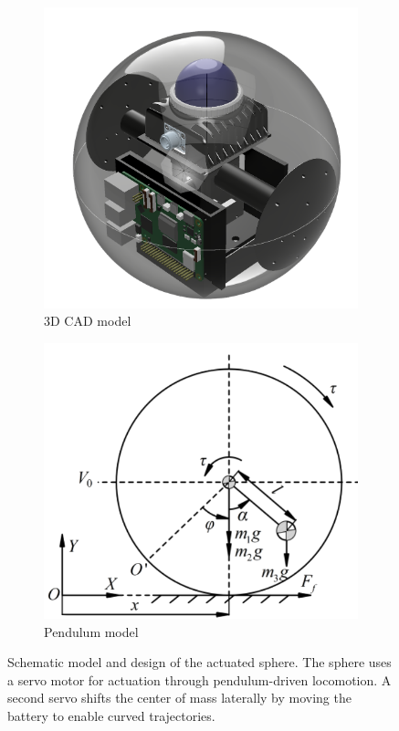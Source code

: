 \documentclass[english, bachelor, utf8]{base/thesis_telematics}
\begin{document}
\begin{figure}[ht]
\begin{subfigure}{0.47\columnwidth}
    \centering
    \includegraphics[width=\textwidth]{pics/Actuated_sphere.png}
    \caption{3D CAD model}
    \label{fig:cad-design2}
\end{subfigure}
\hfill
\begin{subfigure}{0.52\columnwidth}
    \centering
    \includegraphics[width=\textwidth]{pics/planer_model.png}
    \caption{Pendulum model~\cite{Sphere_2D}}
    \label{fig:2d-model2}
\end{subfigure}
\caption{Schematic model and design of the actuated sphere.
The sphere uses a servo motor for actuation through pendulum-driven locomotion.
A second servo shifts the center of mass laterally by moving the battery to enable curved trajectories.}
\label{fig:act-cad-design2}
\end{figure}
\end{document}
